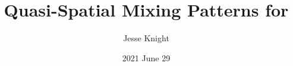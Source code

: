 \title[Quasi-Spatial Mixing]{Quasi-Spatial Mixing Patterns for \Covid}
\author[\texttt{github.com/mishra-lab/covid-on-model}]{Jesse Knight}
\date{2021 June 29}
